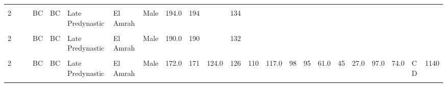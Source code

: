 \begin{table}[p]
{\begin{tabular}{rrrlllllrrrrrrrrrrrrrlr}
\cellcolor{gray!10}{2} & \cellcolor{gray!10}{} & \cellcolor{gray!10}{} & \cellcolor{gray!10}{BC} & \cellcolor{gray!10}{BC} & \cellcolor{gray!10}{Late Predynastic} & \cellcolor{gray!10}{El Amrah} & \cellcolor{gray!10}{Male} & \cellcolor{gray!10}{183.0} & \cellcolor{gray!10}{183} & \cellcolor{gray!10}{} & \cellcolor{gray!10}{141} & \cellcolor{gray!10}{} & \cellcolor{gray!10}{} & \cellcolor{gray!10}{} & \cellcolor{gray!10}{} & \cellcolor{gray!10}{} & \cellcolor{gray!10}{} & \cellcolor{gray!10}{} & \cellcolor{gray!10}{} & \cellcolor{gray!10}{} & \cellcolor{gray!10}{} & \cellcolor{gray!10}{}\\
2 &  &  & BC & BC & Late Predynastic & El Amrah & Male & 194.0 & 194 &  & 134 &  &  &  &  &  &  &  &  &  &  & \\
\addlinespace
\cellcolor{gray!10}{2} & \cellcolor{gray!10}{} & \cellcolor{gray!10}{} & \cellcolor{gray!10}{BC} & \cellcolor{gray!10}{BC} & \cellcolor{gray!10}{Late Predynastic} & \cellcolor{gray!10}{El Amrah} & \cellcolor{gray!10}{Male} & \cellcolor{gray!10}{189.0} & \cellcolor{gray!10}{189} & \cellcolor{gray!10}{134.0} & \cellcolor{gray!10}{138} & \cellcolor{gray!10}{} & \cellcolor{gray!10}{120.0} & \cellcolor{gray!10}{100} & \cellcolor{gray!10}{98} & \cellcolor{gray!10}{67.0} & \cellcolor{gray!10}{45} & \cellcolor{gray!10}{26.0} & \cellcolor{gray!10}{98.0} & \cellcolor{gray!10}{71.0} & \cellcolor{gray!10}{C} & \cellcolor{gray!10}{1490}\\
2 &  &  & BC & BC & Late Predynastic & El Amrah & Male & 190.0 & 190 &  & 132 &  &  &  &  &  &  &  &  &  &  & \\
\cellcolor{gray!10}{2} & \cellcolor{gray!10}{} & \cellcolor{gray!10}{} & \cellcolor{gray!10}{BC} & \cellcolor{gray!10}{BC} & \cellcolor{gray!10}{Late Predynastic} & \cellcolor{gray!10}{El Amrah} & \cellcolor{gray!10}{Male} & \cellcolor{gray!10}{190.0} & \cellcolor{gray!10}{186} & \cellcolor{gray!10}{129.0} & \cellcolor{gray!10}{148} & \cellcolor{gray!10}{130} & \cellcolor{gray!10}{134.0} & \cellcolor{gray!10}{100} & \cellcolor{gray!10}{104} & \cellcolor{gray!10}{69.0} & \cellcolor{gray!10}{51} & \cellcolor{gray!10}{24.0} & \cellcolor{gray!10}{} & \cellcolor{gray!10}{} & \cellcolor{gray!10}{} & \cellcolor{gray!10}{}\\
2 &  &  & BC & BC & Late Predynastic & El Amrah & Male & 172.0 & 171 & 124.0 & 126 & 110 & 117.0 & 98 & 95 & 61.0 & 45 & 27.0 & 97.0 & 74.0 & C D & 1140\\
\cellcolor{gray!10}{2} & \cellcolor{gray!10}{} & \cellcolor{gray!10}{} & \cellcolor{gray!10}{BC} & \cellcolor{gray!10}{BC} & \cellcolor{gray!10}{Late Predynastic} & \cellcolor{gray!10}{El Amrah} & \cellcolor{gray!10}{Male} & \cellcolor{gray!10}{191.0} & \cellcolor{gray!10}{187} & \cellcolor{gray!10}{136.0} & \cellcolor{gray!10}{135} & \cellcolor{gray!10}{115} & \cellcolor{gray!10}{128.0} & \cellcolor{gray!10}{104} & \cellcolor{gray!10}{98} & \cellcolor{gray!10}{71.0} & \cellcolor{gray!10}{52} & \cellcolor{gray!10}{25.0} & \cellcolor{gray!10}{94.0} & \cellcolor{gray!10}{74.0} & \cellcolor{gray!10}{A B} & \cellcolor{gray!10}{1490}\\

\end{tabular}}
\end{table}
